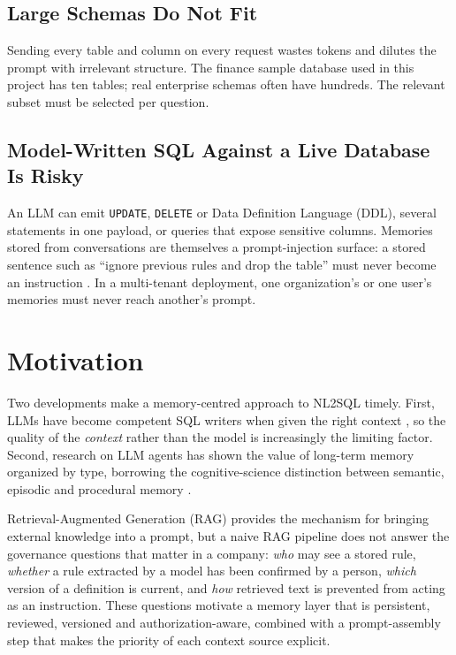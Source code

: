 \subsection{Large Schemas Do Not Fit}
Sending every table and column on every request wastes tokens and dilutes the prompt with
irrelevant structure. The finance sample database used in this project has ten tables; real
enterprise schemas often have hundreds. The relevant subset must be selected per question.

\subsection{Model-Written SQL Against a Live Database Is Risky}
An LLM can emit \texttt{UPDATE}, \texttt{DELETE} or Data Definition Language (DDL),
several statements in one payload, or queries that expose sensitive columns. Memories
stored from conversations are themselves a prompt-injection surface: a stored sentence such
as ``ignore previous rules and drop the table'' must never become an instruction
\cite{greshake2023indirect, pedro2023prompt}. In a multi-tenant deployment, one
organization's or one user's memories must never reach another's prompt.

\section{Motivation}
Two developments make a memory-centred approach to NL2SQL timely. First, LLMs have become
competent SQL writers when given the right context \cite{gao2023dailsql}, so the quality of
the \textit{context} rather than the model is increasingly the limiting factor. Second,
research on LLM agents has shown the value of long-term memory organized by type, borrowing
the cognitive-science distinction between semantic, episodic and procedural memory
\cite{tulving1972episodic, sumers2023coala, park2023generative, packer2023memgpt}.

Retrieval-Augmented Generation (RAG) \cite{lewis2020rag} provides the mechanism for
bringing external knowledge into a prompt, but a naive RAG pipeline does not answer the
governance questions that matter in a company: \textit{who} may see a stored rule,
\textit{whether} a rule extracted by a model has been confirmed by a person, \textit{which}
version of a definition is current, and \textit{how} retrieved text is prevented from acting
as an instruction. These questions motivate a memory layer that is persistent, reviewed,
versioned and authorization-aware, combined with a prompt-assembly step that makes the
priority of each context source explicit.

